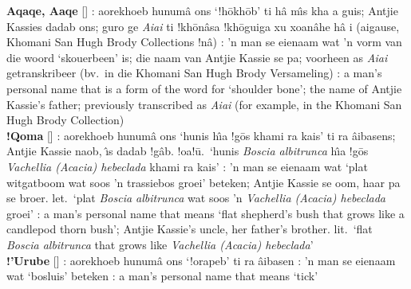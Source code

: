 \textbf{\textdoublevertline{}Aq\textdoublevertline{}aqe,
\textdoublevertline{}A\textdoublevertline{}aqe}
[]
: aorekhoeb \textdoublebarpipe{}hunum\^{a}
\textvertline{}ons `!h\={o}\textdoublebarpipe{}kh\={o}b' ti h\^{a}
m\^{\i}s \textvertline{}kha a \textvertline{}guis; Antjie Kassies
dadab \textvertline{}ons; \textdoublebarpipe{}guro ge
\emph{\textdoublevertline{}Ai\textdoublevertline{}ai} ti
!kh\={o}\textdoublevertline{}n\^{a}sa
!kh\={o}\textdoublevertline{}guiga xu xoa\textdoublevertline{}n\^{a}he
h\^{a} i (ai\textdoublevertline{}gause, \textdoublebarpipe{}Khomani
San Hugh Brody Collections !n\^{a}) : 'n man se eienaam
wat 'n vorm van die woord `skouerbeen' is; die naam van Antjie Kassie
se pa; voorheen as
\emph{\textdoublevertline{}Ai\textdoublevertline{}ai} getranskribeer
(bv.\ in die \textdoublebarpipe{}Khomani San Hugh Brody Versameling)
: a man's personal name that is a form of the word for
`shoulder bone'; the name of Antjie Kassie's father; previously
transcribed as \emph{\textdoublevertline{}Ai\textdoublevertline{}ai}
(for example, in the \textdoublebarpipe{}Khomani San Hugh Brody
Collection) \\

\textbf{!Qoma} [] : aorekhoeb
\textdoublebarpipe{}hunum\^{a} \textvertline{}ons
`\textvertline{}hunis h\^{\i}a !g\={o}s khami ra kais' ti ra
\textdoublebarpipe{}\^{a}ibasens; Antjie Kassie
\textdoublevertline{}naob, \textdoublevertline{}\^{\i}s dadab
!g\^{a}b. !oa!\={u}.\ `\textvertline{}hunis \emph{Boscia albitrunca}
h\^{\i}a !g\={o}s \emph{Vachellia (Acacia) hebeclada} khami ra kais'
: 'n man se eienaam wat `plat witgatboom wat soos 'n
trassiebos groei' beteken; Antjie Kassie se oom, haar pa se broer.
let.\ `plat \emph{Boscia albitrunca} wat soos 'n \emph{Vachellia
(Acacia) hebeclada} groei' : a man's personal name that
means `flat shepherd's bush that grows like a candlepod thorn bush';
Antjie Kassie's uncle, her father's brother. lit.\ `flat \emph{Boscia
albitrunca} that grows like \emph{Vachellia (Acacia) hebeclada}' \\

\textbf{!'Urube} []
: aorekhoeb \textdoublebarpipe{}hunum\^{a}
\textvertline{}ons `!orapeb' ti ra \textdoublebarpipe{}\^{a}ibasen
: 'n man se eienaam wat `bosluis' beteken
: a man's personal name that means `tick' \\



